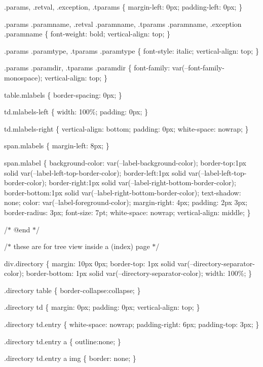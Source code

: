 .params, .retval, .exception, .tparams \{ margin-\/left\+: 0px; padding-\/left\+: 0px; \}

.params .paramname, .retval .paramname, .tparams .paramname, .exception .paramname \{ font-\/weight\+: bold; vertical-\/align\+: top; \}

.params .paramtype, .tparams .paramtype \{ font-\/style\+: italic; vertical-\/align\+: top; \}

.params .paramdir, .tparams .paramdir \{ font-\/family\+: var(--font-\/family-\/monospace); vertical-\/align\+: top; \}

table.\+mlabels \{ border-\/spacing\+: 0px; \}

td.\+mlabels-\/left \{ width\+: 100\%; padding\+: 0px; \}

td.\+mlabels-\/right \{ vertical-\/align\+: bottom; padding\+: 0px; white-\/space\+: nowrap; \}

span.\+mlabels \{ margin-\/left\+: 8px; \}

span.\+mlabel \{ background-\/color\+: var(--label-\/background-\/color); border-\/top\+:1px solid var(--label-\/left-\/top-\/border-\/color); border-\/left\+:1px solid var(--label-\/left-\/top-\/border-\/color); border-\/right\+:1px solid var(--label-\/right-\/bottom-\/border-\/color); border-\/bottom\+:1px solid var(--label-\/right-\/bottom-\/border-\/color); text-\/shadow\+: none; color\+: var(--label-\/foreground-\/color); margin-\/right\+: 4px; padding\+: 2px 3px; border-\/radius\+: 3px; font-\/size\+: 7pt; white-\/space\+: nowrap; vertical-\/align\+: middle; \}

/\texorpdfstring{$\ast$}{*} @end \texorpdfstring{$\ast$}{*}/

/\texorpdfstring{$\ast$}{*} these are for tree view inside a (index) page \texorpdfstring{$\ast$}{*}/

div.\+directory \{ margin\+: 10px 0px; border-\/top\+: 1px solid var(--directory-\/separator-\/color); border-\/bottom\+: 1px solid var(--directory-\/separator-\/color); width\+: 100\%; \}

.directory table \{ border-\/collapse\+:collapse; \}

.directory td \{ margin\+: 0px; padding\+: 0px; vertical-\/align\+: top; \}

.directory td.\+entry \{ white-\/space\+: nowrap; padding-\/right\+: 6px; padding-\/top\+: 3px; \}

.directory td.\+entry a \{ outline\+:none; \}

.directory td.\+entry a img \{ border\+: none; \}

